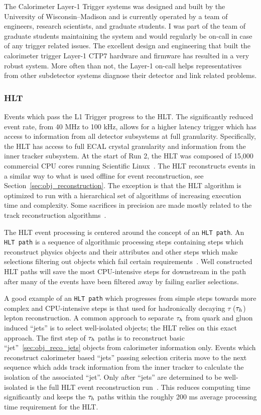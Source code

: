 The Calorimeter Layer-1 Trigger systems was designed and built by the University of
Wisconsin--Madison and is currently operated by a team of engineers, research
scientists, and graduate students. I was part of the team of graduate students maintaining
the system and would regularly be on-call in case of any trigger related issues. The
excellent design and engineering that built the calorimeter trigger Layer-1 CTP7 hardware and firmware
has resulted in a very robust system. More often than not, the Layer-1 on-call
helps representatives from other subdetector systems diagnose their detector and link related problems.



\subsubsection{HLT}
Events which pass the L1 Trigger progress to the HLT. The significantly reduced
event rate, from 40 MHz to 100 kHz, allows for a higher latency trigger which
has access to information from all detector subsystems at full granularity.
Specifically, the HLT has access to full ECAL crystal granularity and
information from the inner tracker subsystem. At the start of Run 2, the HLT
was composed of 15,000 commercial CPU cores running Scientific
Linux~\cite{cms_daq_7097437}. The HLT reconstructs events in a similar way
to what is used offline for event reconstruction, see Section~\ref{sec:obj_reconstruction}. 
The exception is that the HLT algorithm is optimized to run with a hierarchical set of
algorithms of increasing execution time and complexity. Some sacrifices 
in precision are made mostly related to the track reconstruction 
algorithms~\cite{Khachatryan:2016bia}.

The HLT event processing is centered around the concept of an \texttt{HLT path}.
An \texttt{HLT path} is a sequence of algorithmic processing steps containing
steps which reconstruct physics objects and their attributes and other steps
which make selections filtering out objects which fail certain 
requirements~\cite{Khachatryan:2016bia}. Well constructed HLT paths will
save the most CPU-intensive steps for downstream in the path after many of the
events have been filtered away by failing earlier selections. 

A good example
of an \texttt{HLT path} which progresses from simple steps towards more complex and 
CPU-intensive steps is that used for hadronically decaying $\tau$ ($\tau_{h}$) lepton reconstruction.
A common approach to separate $\tau_{h}$ from quark and gluon induced ``jets'' is
to select well-isolated objects; the HLT relies on this exact approach.
The first step of $\tau_{h}$ paths is to reconstruct basic ``jet''~\ref{sec:obj_reco_jets} objects from
calorimeter information only. Events which reconstruct calorimeter based ``jets''
passing selection criteria move to the next sequence which adds track information 
from the inner tracker to calculate the isolation of the associated ``jet''.
Only after ``jets'' are determined to be well-isolated is the full HLT event 
reconstruction run~\cite{Khachatryan:2016bia}. This reduces computing time significantly
and keeps the $\tau_{h}$ paths within the roughly 200 ms average processing time requirement for
the HLT.

